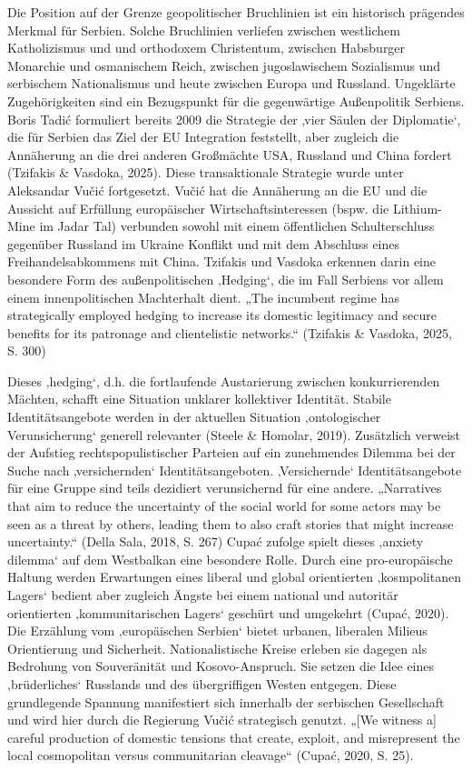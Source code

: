 \documentclass[
  ngerman,
]{agujournal2019}
\begin{document}
Die Position auf der Grenze geopolitischer Bruchlinien ist ein
historisch prägendes Merkmal für Serbien. Solche Bruchlinien verliefen
zwischen westlichem Katholizismus und und orthodoxem Christentum,
zwischen Habsburger Monarchie und osmanischem Reich, zwischen
jugoslawischem Sozialismus und serbischem Nationalismus und heute
zwischen Europa und Russland. Ungeklärte Zugehörigkeiten sind ein
Bezugspunkt für die gegenwärtige Außenpolitik Serbiens. Boris Tadić
formuliert bereits 2009 die Strategie der ‚vier Säulen der Diplomatie`,
die für Serbien das Ziel der EU Integration feststellt, aber zugleich
die Annäherung an die drei anderen Großmächte USA, Russland und China
fordert (Tzifakis \& Vasdoka, 2025). Diese transaktionale Strategie
wurde unter Aleksandar Vučić fortgesetzt. Vučić hat die Annäherung an
die EU und die Aussicht auf Erfüllung europäischer Wirtschaftsinteressen
(bspw. die Lithium-Mine im Jadar Tal) verbunden sowohl mit einem
öffentlichen Schulterschluss gegenüber Russland im Ukraine Konflikt und
mit dem Abschluss eines Freihandelsabkommens mit China. Tzifakis und
Vasdoka erkennen darin eine besondere Form des außenpolitischen
‚Hedging`, die im Fall Serbiens vor allem einem innenpolitischen
Machterhalt dient. „The incumbent regime has strategically employed
hedging to increase its domestic legitimacy and secure benefits for its
patronage and clientelistic networks.`` (Tzifakis \& Vasdoka, 2025, S.
300)

Dieses ‚hedging`, d.h. die fortlaufende Austarierung zwischen
konkurrierenden Mächten, schafft eine Situation unklarer kollektiver
Identität. Stabile Identitätsangebote werden in der aktuellen Situation
‚ontologischer Verunsicherung` generell relevanter (Steele \& Homolar,
2019). Zusätzlich verweist der Aufstieg rechtspopulistischer Parteien
auf ein zunehmendes Dilemma bei der Suche nach ‚versichernden`
Identitätsangeboten. ‚Versichernde` Identitätsangebote für eine Gruppe
sind teils dezidiert verunsichernd für eine andere. „Narratives that aim
to reduce the uncertainty of the social world for some actors may be
seen as a threat by others, leading them to also craft stories that
might increase uncertainty.`` (Della Sala, 2018, S. 267) Cupać zufolge
spielt dieses ‚anxiety dilemma` auf dem Westbalkan eine besondere Rolle.
Durch eine pro-europäische Haltung werden Erwartungen eines liberal und
global orientierten ‚kosmpolitanen Lagers` bedient aber zugleich Ängste
bei einem national und autoritär orientierten ‚kommunitarischen Lagers`
geschürt und umgekehrt (Cupać, 2020). Die Erzählung vom ‚europäischen
Serbien` bietet urbanen, liberalen Milieus Orientierung und Sicherheit.
Nationalistische Kreise erleben sie dagegen als Bedrohung von
Souveränität und Kosovo-Anspruch. Sie setzen die Idee eines
‚brüderliches` Russlands und des übergriffigen Westen entgegen. Diese
grundlegende Spannung manifestiert sich innerhalb der serbischen
Gesellschaft und wird hier durch die Regierung Vučić strategisch
genutzt. „{[}We witness a{]} careful production of domestic tensions
that create, exploit, and misrepresent the local cosmopolitan versus
communitarian cleavage`` (Cupać, 2020, S. 25).
\end{document}
